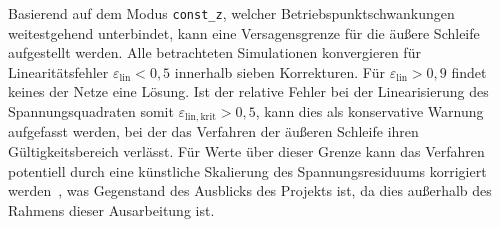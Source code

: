 
Basierend auf dem Modus \texttt{const\_z}, welcher Betriebspunktschwankungen weitestgehend unterbindet, kann eine Versagensgrenze für die äußere Schleife aufgestellt werden.
Alle betrachteten Simulationen konvergieren für Linearitätsfehler $\varepsilon_{\mathrm{lin}} < 0,5$ innerhalb sieben Korrekturen. Für $\varepsilon_{\mathrm{lin}} > 0,9$ findet keines der Netze eine Lösung.
Ist der relative Fehler bei der Linearisierung des Spannungsquadraten somit $\varepsilon_{\mathrm{lin, krit}} > 0,5$, kann dies als konservative Warnung aufgefasst werden, bei der das Verfahren der äußeren Schleife ihren Gültigkeitsbereich verlässt.
Für Werte über dieser Grenze kann das Verfahren potentiell durch eine künstliche Skalierung des Spannungsresiduums korrigiert werden~\cite{IwamotoTamura1981}, was Gegenstand des Ausblicks des Projekts ist, da dies außerhalb des Rahmens dieser Ausarbeitung ist.
\\

